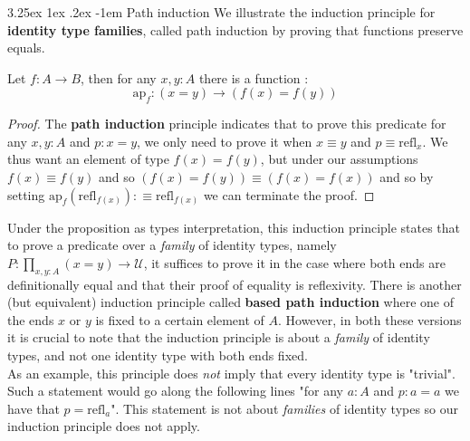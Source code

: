 \documentclass{report}
\makeatletter
\renewcommand\paragraph{\@startsection{paragraph}{5}{\z@}%
  {3.25ex \@plus1ex \@minus.2ex}%
  {-1em}%
  {\normalfont\normalsize\bfseries}}
\makeatother
\begin{document}
\paragraph{Path induction}
We illustrate the induction principle for \textbf{identity type families}, called path induction by proving that functions preserve equals.
\begin{prop}
Let $f : A \rightarrow B$, then for any $x,y :A$ there is a function :
$$\mathrm{ap}_f : (x=y) \rightarrow (f(x)=f(y))$$ 
\end{prop}
\begin{proof}
The \textbf{path induction} principle indicates that to prove this predicate for any $x,y : A$ and $p : x=y$, we only need to prove it when $x\equiv y$ and $p \equiv \mathrm{refl}_x$. We thus want an element of type  $f(x) = f(y)$, but under our assumptions $f(x) \equiv f(y)$ and so $(f(x)=f(y)) \equiv (f(x)=f(x))$ and so by setting $\mathrm{ap}_f(\mathrm{refl}_{f(x)}) :\equiv \mathrm{refl}_{f(x)}$ we can terminate the proof. 
\end{proof}
Under the proposition as types interpretation, this induction principle states that to prove a predicate over a \textit{family} of identity types, namely $P : \prod_{x,y : A} (x=y) \rightarrow \mathcal{U}$, it suffices to prove it in the case where both ends are definitionally equal and that their proof of equality is reflexivity. There is another (but equivalent) induction principle called \textbf{based path induction} where one of the ends $x$ or $y$ is fixed to a certain element of $A$. However, in both these versions it is crucial to note that the induction principle is about a \textit{family} of identity types, and not one identity type with both ends fixed.\\
As an example, this principle does \textit{not} imply that every identity type is "trivial". Such a statement would go along the following lines "for any $a : A$ and $p: a=a$ we have that $p = \mathrm{refl}_a$". This statement is not about \textit{families} of identity types so our induction principle does not apply.
\end{document}
